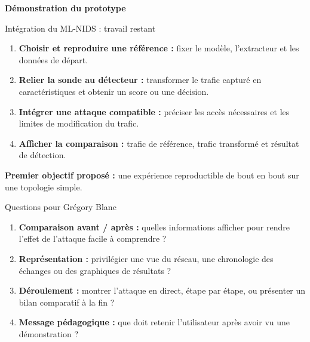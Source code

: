 \documentclass[aspectratio=169,11pt,xcolor=table]{beamer}
\newcommand{\espacement}{\setlength{\itemsep}{.8em}}
\begin{document}
\begin{frame}[plain]
  \centering
  {\fontsize{36}{44}\selectfont\bfseries\color{projectblue} Démonstration du prototype\par}
\end{frame}

\begin{frame}{Intégration du ML-NIDS : travail restant}
  \begin{enumerate}\espacement
    \item \textbf{Choisir et reproduire une référence :} fixer le modèle, l'extracteur et les données de départ.
    \item \textbf{Relier la sonde au détecteur :} transformer le trafic capturé en caractéristiques et obtenir un score ou une décision.
    \item \textbf{Intégrer une attaque compatible :} préciser les accès nécessaires et les limites de modification du trafic.
    \item \textbf{Afficher la comparaison :} trafic de référence, trafic transformé et résultat de détection.
  \end{enumerate}
  \vfill
  \textbf{Premier objectif proposé :} une expérience reproductible de bout en bout sur une topologie simple.
\end{frame}

\begin{frame}{Questions pour Grégory Blanc}
  \begin{enumerate}\espacement
    \item \textbf{Comparaison avant / après :} quelles informations afficher pour rendre l'effet de l'attaque facile à comprendre ?
    \item \textbf{Représentation :} privilégier une vue du réseau, une chronologie des échanges ou des graphiques de résultats ?
    \item \textbf{Déroulement :} montrer l'attaque en direct, étape par étape, ou présenter un bilan comparatif à la fin ?
    \item \textbf{Message pédagogique :} que doit retenir l'utilisateur après avoir vu une démonstration ?
  \end{enumerate}
\end{frame}
\end{document}
